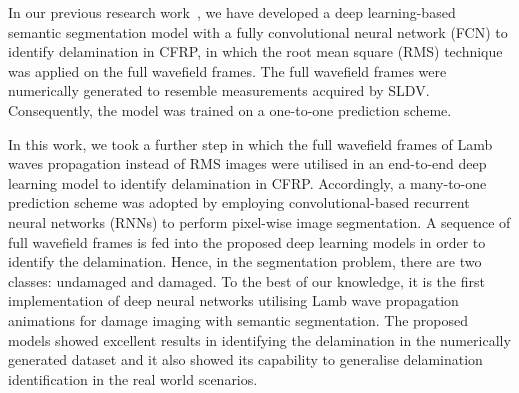 In our previous research work~\cite{Ijjeh2021}, we have developed a deep learning-based semantic segmentation model with a fully convolutional neural network (FCN) to identify delamination in CFRP, in which the root mean square (RMS) technique was applied on the full wavefield frames. 
The full wavefield frames were numerically generated to resemble measurements acquired by SLDV.  
Consequently, the model was trained on a one-to-one prediction scheme.

In this work, we took a further step in which the full wavefield frames of Lamb waves propagation instead of RMS images were utilised in an end-to-end deep learning model to identify delamination in CFRP.
Accordingly, a many-to-one prediction scheme was adopted by employing convolutional-based recurrent neural networks (RNNs) to perform pixel-wise image segmentation.
A sequence of full wavefield frames is fed into the proposed deep learning models in order to identify the delamination.
Hence, in the segmentation problem, there are two classes: undamaged and damaged.
To the best of our knowledge, it is the first implementation of deep neural networks utilising Lamb wave propagation animations for damage imaging with semantic segmentation.
The proposed models showed excellent results in identifying the delamination in the numerically generated dataset and it also showed its capability to generalise delamination identification in the real world scenarios.
